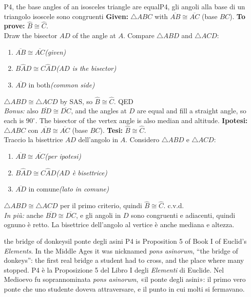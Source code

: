 \documentclass[10pt,a4paper,oneside]{book}
\newcommand{\ang}[3]{#1\widehat{#2}#3}      %
\newcommand{\av}[1]{\widehat{#1}}           %
\newcommand{\seg}[1]{\overline{#1}}         %
\newcommand{\tri}[1]{\triangle #1}          %
\newcommand{\step}[2]{\item #1\hfill{\small\color{slate}\itshape(#2)}}
\newenvironment{steps}{\begin{enumerate}[label=\arabic*., leftmargin=1.5em, itemsep=1pt]}{\end{enumerate}}
\begin{document}
\begin{proofbox}{P4, the base angles of an isosceles triangle are equal}{P4, gli angoli alla base di un triangolo isoscele sono congruenti}
\textbf{Given:} $\tri{ABC}$ with $\seg{AB} \cong \seg{AC}$ (base $BC$). \textbf{To prove:} $\av{B} \cong \av{C}$.\\
Draw the bisector $AD$ of the angle at $A$. Compare $\tri{ABD}$ and $\tri{ACD}$:
\begin{steps}
\step{$\seg{AB} \cong \seg{AC}$}{given}
\step{$\ang{B}{A}{D} \cong \ang{C}{A}{D}$}{$AD$ is the bisector}
\step{$\seg{AD}$ in both}{common side}
\end{steps}
$\tri{ABD} \cong \tri{ACD}$ by SAS, so $\av{B} \cong \av{C}$. \hfill QED\\
\emph{Bonus:} also $\seg{BD} \cong \seg{DC}$, and the angles at $D$ are equal and fill a straight angle, so each is $90^\circ$. The bisector of the vertex angle is also median and altitude.
\tcblower
\textbf{Ipotesi:} $\tri{ABC}$ con $\seg{AB} \cong \seg{AC}$ (base $BC$). \textbf{Tesi:} $\av{B} \cong \av{C}$.\\
Traccio la bisettrice $AD$ dell'angolo in $A$. Considero $\tri{ABD}$ e $\tri{ACD}$:
\begin{steps}
\step{$\seg{AB} \cong \seg{AC}$}{per ipotesi}
\step{$\ang{B}{A}{D} \cong \ang{C}{A}{D}$}{$AD$ è bisettrice}
\step{$\seg{AD}$ in comune}{lato in comune}
\end{steps}
$\tri{ABD} \cong \tri{ACD}$ per il primo criterio, quindi $\av{B} \cong \av{C}$. \hfill c.v.d.\\
\emph{In più:} anche $\seg{BD} \cong \seg{DC}$, e gli angoli in $D$ sono congruenti e adiacenti, quindi ognuno è retto. La bisettrice dell'angolo al vertice è anche mediana e altezza.
\end{proofbox}

\begin{history}{the bridge of donkeys}{il ponte degli asini}
P4 is Proposition 5 of Book I of Euclid's \emph{Elements}. In the Middle Ages it was nicknamed \emph{pons asinorum}, ``the bridge of donkeys'': the first real bridge a student had to cross, and the place where many stopped.
\tcblower
P4 è la Proposizione 5 del Libro I degli \emph{Elementi} di Euclide. Nel Medioevo fu soprannominata \emph{pons asinorum}, «il ponte degli asini»: il primo vero ponte che uno studente doveva attraversare, e il punto in cui molti si fermavano.
\end{history}
\end{document}

